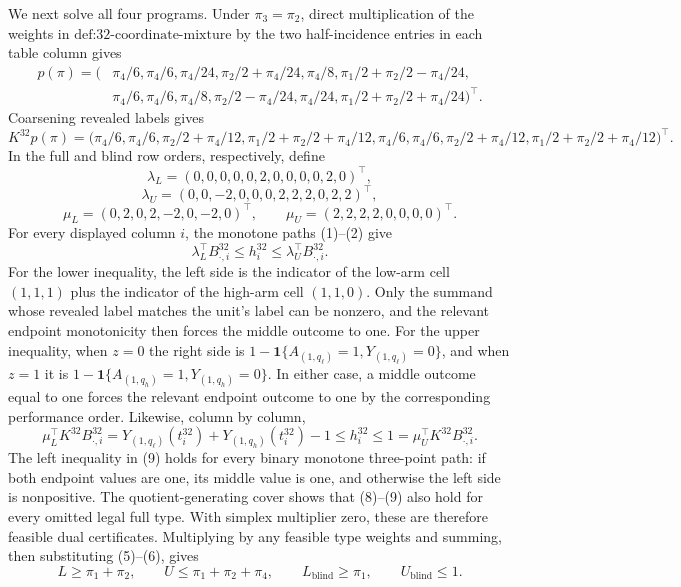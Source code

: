 We next solve all four programs.  Under \(\pi_3=\pi_2\), direct multiplication of the weights in \(\text{def:32-coordinate-mixture}\) by the two half-incidence entries in each table column gives
\[
\begin{aligned}
p(\pi)=\bigl(&\pi_4/6,\pi_4/6,\pi_4/24,\pi_2/2+\pi_4/24,\pi_4/8,
\pi_1/2+\pi_2/2-\pi_4/24,\\
&\pi_4/6,\pi_4/6,\pi_4/8,\pi_2/2-\pi_4/24,\pi_4/24,
\pi_1/2+\pi_2/2+\pi_4/24\bigr)^{\top}.
\end{aligned}
\tag{5}
\]
Coarsening revealed labels gives
\[
K^{32}p(\pi)=\bigl(\pi_4/6,\pi_4/6,\pi_2/2+\pi_4/12,
\pi_1/2+\pi_2/2+\pi_4/12,\pi_4/6,\pi_4/6,
\pi_2/2+\pi_4/12,\pi_1/2+\pi_2/2+\pi_4/12\bigr)^{\top}.
\tag{6}
\]
In the full and blind row orders, respectively, define
\[
\lambda_L=(0,0,0,0,0,2,0,0,0,0,2,0)^{\top},
\]
\[
\lambda_U=(0,0,-2,0,0,0,2,2,2,0,2,2)^{\top},
\]
\[
\mu_L=(0,2,0,2,-2,0,-2,0)^{\top},
\qquad
\mu_U=(2,2,2,2,0,0,0,0)^{\top}.
\tag{7}
\]
For every displayed column \(i\), the monotone paths (1)--(2) give
\[
\lambda_L^{\top}B^{32}_{\cdot,i}\leq h^{32}_i
\leq\lambda_U^{\top}B^{32}_{\cdot,i}.
\tag{8}
\]
For the lower inequality, the left side is the indicator of the low-arm cell \((1,1,1)\) plus the indicator of the high-arm cell \((1,1,0)\).  Only the summand whose revealed label matches the unit's label can be nonzero, and the relevant endpoint monotonicity then forces the middle outcome to one.  For the upper inequality, when \(z=0\) the right side is
\(1-\mathbf 1\{A_{(1,q_\ell)}=1,Y_{(1,q_\ell)}=0\}\), and when \(z=1\) it is
\(1-\mathbf 1\{A_{(1,q_h)}=1,Y_{(1,q_h)}=0\}\).  In either case, a middle outcome equal to one forces the relevant endpoint outcome to one by the corresponding performance order.  Likewise, column by column,
\[
\mu_L^{\top}K^{32}B^{32}_{\cdot,i}
=Y_{(1,q_\ell)}(t_i^{32})+Y_{(1,q_h)}(t_i^{32})-1
\leq h_i^{32}
\leq1
=\mu_U^{\top}K^{32}B^{32}_{\cdot,i}.
\tag{9}
\]
The left inequality in (9) holds for every binary monotone three-point path: if both endpoint values are one, its middle value is one, and otherwise the left side is nonpositive.  The quotient-generating cover shows that (8)--(9) also hold for every omitted legal full type.  With simplex multiplier zero, these are therefore feasible dual certificates.  Multiplying by any feasible type weights and summing, then substituting (5)--(6), gives
\[
L\geq\pi_1+\pi_2,
\qquad
U\leq\pi_1+\pi_2+\pi_4,
\qquad
L_{\mathrm{blind}}\geq\pi_1,
\qquad
U_{\mathrm{blind}}\leq1.
\tag{10}
\]

